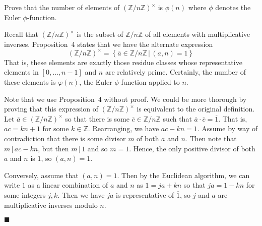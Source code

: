 \documentclass[12pt]{article}
\renewcommand{\qed}{\hfill$\blacksquare$}
\renewenvironment{proof}{\begin{addmargin}[1em]{0em}\begin{newproof}}{\end{newproof}\end{addmargin}\qed}
\newenvironment{problem}[2][Exercise]{\begin{trivlist}
\item[\hskip \labelsep {\bfseries #1}\hskip \labelsep {\bfseries #2.}]}{\end{trivlist}}
\begin{document}
\begin{problem}{0.3.10}
Prove that the number of elements of $\left(\mathbb{Z}/n\mathbb{Z}\right)^{\times}$ is $\phi\left(n\right)$ where $\phi$ denotes the Euler $\phi$-function.
\end{problem}
\begin{proof}
Recall that $\left(\mathbb{Z}/n\mathbb{Z}\right)^{\times}$ is the subset of $\mathbb{Z}/n\mathbb{Z}$ of all elements with multiplicative inverses. Proposition~4 states that we have the alternate expression \[ \left(\mathbb{Z}/n\mathbb{Z}\right)^{\times} = \left\{ \overline{a} \in \mathbb{Z}/n\mathbb{Z}\, | \, \left(a,n\right)=1 \right\} \] That is, these elements are exactly those residue classes whose representative elements in $\left[0,\ldots,n-1\right]$ and $n$ are relatively prime. Certainly, the number of these elements is $\varphi\left(n\right)$, the Euler $\phi$-function applied to $n$.

Note that we use Proposition~4 without proof. We could be more thorough by proving that this expression of $\left(\mathbb{Z}/n\mathbb{Z}\right)^{\times}$ is equivalent to the original definition. Let $\overline{a} \in \left(\mathbb{Z}/n\mathbb{Z}\right)^{\times}$ so that there is some $\overline{c}\in \mathbb{Z}/n\mathbb{Z}$ such that $\overline{a}\cdot \overline{c} = \overline{1}$. That is, $ac = kn+1$ for some $k\in \mathbb{Z}$. Rearranging, we have $ac-kn = 1$. Assume by way of contradiction that there is some divisor $m$ of both $a$ and $n$. Then note that $m \, | \, ac-kn$, but then $m \, | \, 1$ and so $m=1$. Hence, the only positive divisor of both $a$ and $n$ is $1$, so $\left(a,n\right)=1$.

Conversely, assume that $\left(a,n\right)=1$. Then by the Euclidean algorithm, we can write $1$ as a linear combination of $a$ and $n$ as $1=ja+kn$ so that $ja=1-kn$ for some integers $j,k$. Then we have $ja$ is representative of $\overline{1}$, so $j$ and $a$ are multiplicative inverses modulo $n$.
\end{proof}
\end{document}
